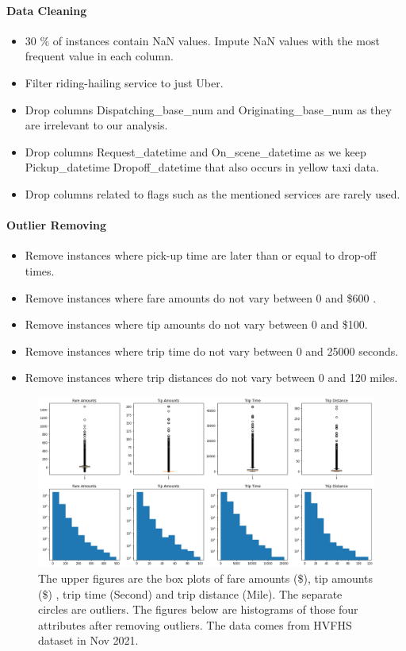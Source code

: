 \documentclass[11pt]{article}
\begin{document}
\paragraph{Data Cleaning}
\begin{itemize}
    \item 30 \% of instances contain NaN values. Impute NaN values with the most frequent value in each column.
    \item Filter riding-hailing service to just Uber.
    \item Drop columns Dispatching\_base\_num and Originating\_base\_num as they are irrelevant to our analysis.
    \item Drop columns Request\_datetime and On\_scene\_datetime as we keep Pickup\_datetime	Dropoff\_datetime that also occurs in yellow taxi data.
    \item Drop columns related to flags such as the mentioned services are rarely used.
\end{itemize}
\paragraph{Outlier Removing}
\begin{itemize}
    \item  Remove instances where pick-up time are later than or equal to drop-off times.
    \item Remove instances where fare amounts do not vary between 0 and \$600 .
    \item Remove instances where tip amounts do not vary between 0 and \$100.
    \item Remove instances where trip time do not vary between 0 and 25000 seconds.
    \item Remove instances where trip distances do not vary between 0 and 120 miles.
\end{itemize}

\begin{figure}
    \centering
    \includegraphics[scale = 0.35]{explore_fhvhv.png}
    \caption{The upper figures are the box plots of fare amounts (\$), tip amounts (\$) , trip time (Second) and trip distance (Mile). The separate circles are outliers. The figures below are histograms of those four attributes after removing outliers. The data comes from HVFHS dataset in Nov 2021.}
    \label{fig:explore_fh}
\end{figure}
\end{document}
